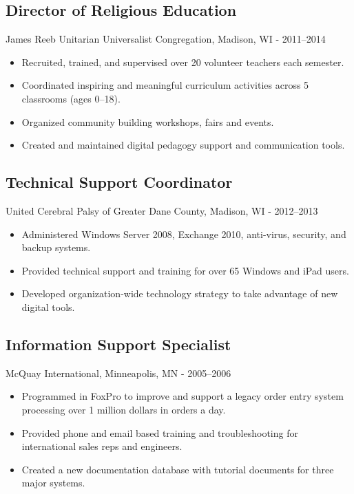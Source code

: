 \documentclass[../main.tex]{subfiles}
\begin{document}
	\subsection*{Director of Religious Education}
     James Reeb Unitarian Universalist Congregation, Madison, WI - 2011--2014
	\begin{itemize}
		\item{Recruited, trained, and supervised over 20 volunteer teachers each semester.}
		\item{Coordinated inspiring and meaningful curriculum activities across 5 classrooms (ages 0--18).}
		\item{Organized community building workshops, fairs and events.}
		\item{Created and maintained digital pedagogy support and communication tools.}
	\end{itemize}


	\subsection*{Technical Support Coordinator}
     United Cerebral Palsy of Greater Dane County, Madison, WI - 2012--2013
	\begin{itemize}
		\item{Administered Windows Server 2008, Exchange 2010, anti-virus, security, and backup systems.}
		\item{Provided technical support and training for over 65 Windows and iPad users.}
		\item{Developed organization-wide technology strategy to take advantage of new digital tools.}
	\end{itemize}


\subsection*{Information Support Specialist}
     McQuay International, Minneapolis, MN - 2005--2006
	\begin{itemize}
		\item{Programmed in FoxPro to improve and support a legacy order entry system processing over 1 million dollars in orders a day.}
		\item{Provided phone and email based training and troubleshooting for international sales reps and engineers.}
		\item{Created a new documentation database with tutorial documents for three major systems.}
	\end{itemize}
\end{document}
